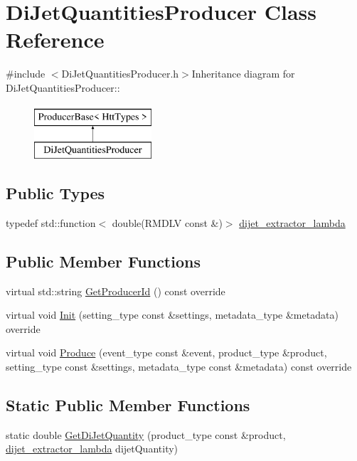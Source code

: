 \hypertarget{classDiJetQuantitiesProducer}{
\section{DiJetQuantitiesProducer Class Reference}
\label{classDiJetQuantitiesProducer}
}


{\ttfamily \#include $<$DiJetQuantitiesProducer.h$>$}Inheritance diagram for DiJetQuantitiesProducer::\begin{figure}[H]
\begin{center}
\leavevmode
\includegraphics[height=2cm]{classDiJetQuantitiesProducer}
\end{center}
\end{figure}
\subsection*{Public Types}
\begin{DoxyCompactItemize}
\item 
typedef std::function$<$ double(RMDLV const \&)$>$ \hyperlink{classDiJetQuantitiesProducer_a08cdb9a72346178635bc116c04ef6271}{dijet\_\-extractor\_\-lambda}
\end{DoxyCompactItemize}
\subsection*{Public Member Functions}
\begin{DoxyCompactItemize}
\item 
virtual std::string \hyperlink{classDiJetQuantitiesProducer_a9fce10c46aed19eabf7bce163b9b129d}{GetProducerId} () const override
\item 
virtual void \hyperlink{classDiJetQuantitiesProducer_aab4d47b6a70353c6c37f15f461dd97b1}{Init} (setting\_\-type const \&settings, metadata\_\-type \&metadata) override
\item 
virtual void \hyperlink{classDiJetQuantitiesProducer_a94dddcf5600c7c6d97d14c86b44115da}{Produce} (event\_\-type const \&event, product\_\-type \&product, setting\_\-type const \&settings, metadata\_\-type const \&metadata) const override
\end{DoxyCompactItemize}
\subsection*{Static Public Member Functions}
\begin{DoxyCompactItemize}
\item 
static double \hyperlink{classDiJetQuantitiesProducer_a11fe61b81d216c394cf0dfcdd6935ba0}{GetDiJetQuantity} (product\_\-type const \&product, \hyperlink{classDiJetQuantitiesProducer_a08cdb9a72346178635bc116c04ef6271}{dijet\_\-extractor\_\-lambda} dijetQuantity)
\end{DoxyCompactItemize}


